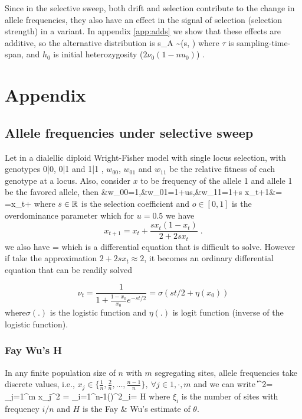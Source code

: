 \documentclass[11pt]{article}
\begin{document}
Since in the selective sweep, both drift and selection contribute to the change 
in allele frequencies, they also have an effect in the signal of selection 
(selection strength) in a variant. In appendix \ref{app:adds} we show that 
these effects are additive, so the alternative distribution is
\beq
s_{A} \sim \Nc(s, )
\eeq
where $\tau$ is sampling-time-span, and $h_0$ is initial heterozygosity 
($2\nu_0(1-nu_0)$) .


\newpage
\section{Appendix}
\subsection{Allele frequencies under selective sweep} \label{app:af}
Let in a dialellic diploid Wright-Fisher model with single locus selection, 
with genotypes 0|0, 0|1 and 1|1 , $w_{00}$, $w_{01}$ and  $w_{11}$ be the 
relative fitness of each genotype at a locus. Also, consider $x$ to be 
frequency of the allele 1 and allele 1 be the favored allele, then
\beq
&w_{00}=1,&w_{01}=1+us,&w_{11}=1+s
\eeq
\beq
x_{t+1}&= =x_t+
\eeq
where $s\in {\mathbb R}$ is the selection coefficient and $o\in[0,1]$ is the 
overdominance parameter which for $u=0.5$ we have
\begin{equation}
x_{t+1}=x_t+\frac{sx_t(1-x_t)}{2+2sx_t}\;.
\label{eq:hequalshalf}
\end{equation}
we also have
\beq
{} = 
\eeq
which is a differential equation that is difficult to solve. However if take 
the approximation $2+2sx_t \approx 2$, it becomes an ordinary differential 
equation that can be readily solved

\begin{equation}
\nu_t =\frac{1}{1+\frac{1-x_0}{x_0}e^{-st/2}} = \sigma(st/2+\eta(x_0)) 
\label{eq:inf-pop}
\end{equation}
where$\sigma(.)$ is the logistic
function and $\eta(.)$ is logit function (inverse of the logistic function). 

\subsubsection{Fay Wu's H}\label{app:h}
\bl
In any finite population size of $n$ with $m$ segregating sites, 
allele frequencies take 
discrete values, i.e.,  $x_j \in 
\{\frac{1}{n},\frac{2}{n},\ldots,\frac{n-1}{n}\}, \ \forall j \in{1,\cdot,m}$ 
and we can write
\beq
\|\bfx\|^2= \sum_{j=1}^{m} x_j^2 = 
\sum_{i=1}^{n-1}\left(\right)^2\xi_i= 
H 
\eeq
where $\xi_i$ is the number of sites with frequency $i/n$ and $H$ is the 
Fay \& Wu's estimate of $\theta$.
\el
\end{document}
